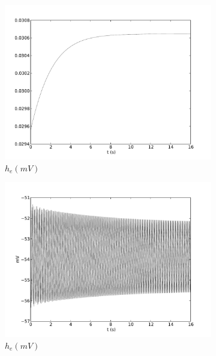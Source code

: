 \documentclass[a4paper,12pt]{article}
\begin{document}
\begin{figure}
	\begin{subfigure}[b]{0.5\textwidth}
		\includegraphics[scale=0.35]{frontiers-2012-images-revised/effect_gamma_ee_yml-00143_ode-burst-thal-rev_yml-thal-rev-mod-1_2-0_5-1-save_yml-slow-thal.pdf}
		\caption{$h_e (mV)$}
	\end{subfigure}
	\begin{subfigure}[b]{0.5\textwidth}
		\includegraphics[scale=0.35]{frontiers-2012-images-revised/effect_gamma_ee_yml-00143_ode-burst-thal-rev_yml-thal-rev-mod-1-0_5-1-save_yml-he-thal.pdf}
		\caption{$h_e (mV)$}
	\end{subfigure}
	\begin{subfigure}[b]{0.5\textwidth}

\end{subfigure}
\end{figure}
\end{document}
